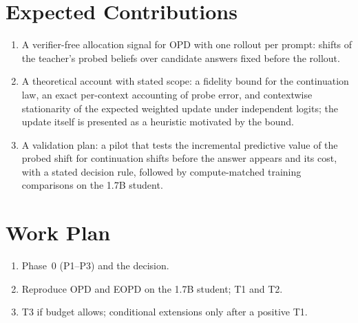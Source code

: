 \documentclass[11pt]{article}
\theoremstyle{definition}
\theoremstyle{remark}
\begin{document}
\section{Expected Contributions}
\begin{enumerate}[itemsep=3pt]
\item A verifier-free allocation signal for OPD with one rollout per prompt: shifts of the teacher's probed beliefs over candidate answers fixed before the rollout.
\item A theoretical account with stated scope: a fidelity bound for the continuation law, an exact per-context accounting of probe error, and contextwise stationarity of the expected weighted update under independent logits; the update itself is presented as a heuristic motivated by the bound.
\item A validation plan: a pilot that tests the incremental predictive value of the probed shift for continuation shifts before the answer appears and its cost, with a stated decision rule, followed by compute-matched training comparisons on the 1.7B student.
\end{enumerate}

\section{Work Plan}
\begin{enumerate}[itemsep=2pt]
\item[Step 1.] Phase~0 (P1--P3) and the decision.
\item[Step 2.] Reproduce OPD and EOPD on the 1.7B student; T1 and T2.
\item[Step 3.] T3 if budget allows; conditional extensions only after a positive T1.
\end{enumerate}
\end{document}
